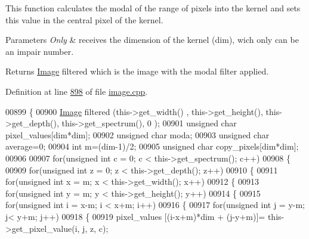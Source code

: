 This function calculates the modal of the range of pixels into the kernel and sets this value in the central pixel of the kernel. 


\begin{DoxyParams}{Parameters}
{\em Only} & receives the dimension of the kernel (dim), wich only can be an impair number. \\
\hline
\end{DoxyParams}
\begin{DoxyReturn}{Returns}
\hyperlink{class_image}{Image} filtered which is the image with the modal filter applied. 
\end{DoxyReturn}


Definition at line \hyperlink{image_8cpp_source_l00898}{898} of file \hyperlink{image_8cpp_source}{image.\-cpp}.


\begin{DoxyCode}
00899 \{
00900     \hyperlink{class_image}{Image} filtered (this->get\_width() , this->get\_height(), this->get\_depth(), this->get\_spectrum(), 0
      );
00901     \textcolor{keywordtype}{unsigned} \textcolor{keywordtype}{char} pixel\_values[dim*dim];
00902     \textcolor{keywordtype}{unsigned} \textcolor{keywordtype}{char} moda;
00903     \textcolor{keywordtype}{unsigned} \textcolor{keywordtype}{char} average=0;
00904     \textcolor{keywordtype}{int} m=(dim-1)/2;
00905     \textcolor{keywordtype}{unsigned} \textcolor{keywordtype}{char} copy\_pixels[dim*dim];
00906 
00907     \textcolor{keywordflow}{for}(\textcolor{keywordtype}{unsigned} \textcolor{keywordtype}{int} c = 0; c < this->get\_spectrum(); c++)
00908     \{
00909         \textcolor{keywordflow}{for}(\textcolor{keywordtype}{unsigned} \textcolor{keywordtype}{int} z = 0; z < this->get\_depth(); z++)
00910         \{
00911             \textcolor{keywordflow}{for}(\textcolor{keywordtype}{unsigned} \textcolor{keywordtype}{int} x = m; x < this->get\_width(); x++)
00912             \{
00913                 \textcolor{keywordflow}{for}(\textcolor{keywordtype}{unsigned} \textcolor{keywordtype}{int} y = m; y < this->get\_height(); y++)
00914                 \{
00915                     \textcolor{keywordflow}{for}(\textcolor{keywordtype}{unsigned} \textcolor{keywordtype}{int} i = x-m; i < x+m; i++)
00916                     \{
00917                         \textcolor{keywordflow}{for}(\textcolor{keywordtype}{unsigned} \textcolor{keywordtype}{int} j = y-m; j< y+m; j++)
00918                         \{
00919                             pixel\_values [(i-x+m)*dim + (j-y+m)]= this->get\_pixel\_value(i, j, z, c);

\end{DoxyCode}

